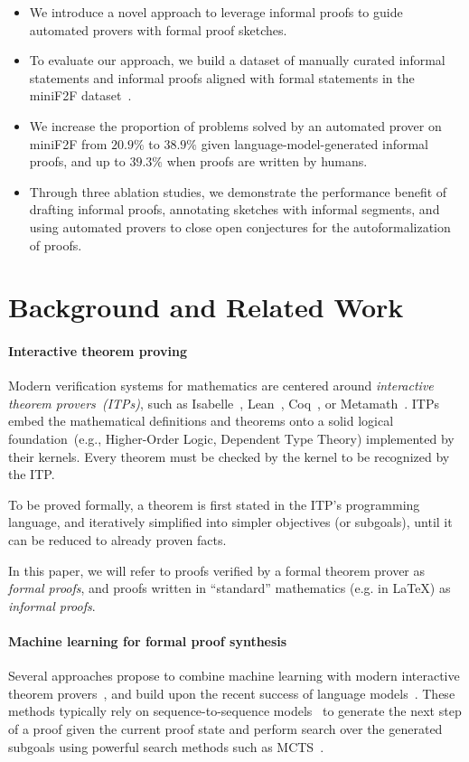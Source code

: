 \begin{itemize}
\item We introduce a novel approach to leverage informal proofs to guide automated provers with formal proof sketches.
\item To evaluate our approach, we build a dataset of manually curated informal statements and informal proofs aligned with formal statements in the miniF2F dataset~\citep{zheng2021minif2f}.

\item We increase the proportion of problems solved by an automated prover on miniF2F from $20.9\%$ to $38.9\%$ given language-model-generated informal proofs, and up to $39.3\%$
when proofs are written by humans.
\item Through three ablation studies, we demonstrate the performance benefit of drafting informal proofs, annotating sketches with informal segments, and using automated provers to close open conjectures for the autoformalization of proofs.
\end{itemize}

\section{Background and Related Work}
\label{sec:background}

\paragraph{Interactive theorem proving} Modern verification systems for mathematics are centered around \textit{interactive theorem provers~(ITPs)}, such as Isabelle~\citep{paulson1994isabelle}, Lean~\citep{moura2015lean}, Coq~\citep{barras1997coq}, or Metamath~\citep{metamath}. ITPs embed the mathematical definitions and theorems onto a solid logical foundation~(e.g., Higher-Order Logic, Dependent Type Theory) implemented by their kernels. Every theorem must be checked by the kernel to be recognized by the ITP.

To be proved formally, a theorem is first stated in the ITP's programming language, and iteratively simplified into simpler objectives (or subgoals), until it can be reduced to already proven facts.

In this paper, we will refer to proofs verified by a formal theorem prover as \textit{formal proofs}, and proofs written in ``standard'' mathematics (e.g. in \LaTeX) as \textit{informal proofs}.

\paragraph{Machine learning for formal proof synthesis} Several approaches propose to combine machine learning with modern interactive theorem provers~\citep{yang2019coqgym,gauthier2021tactictoe}, and build upon the recent success of language models~\citep{polu2020generative,pact,polu2022formal,jiang2022thor,lample2022hypertree}. These methods typically rely on sequence-to-sequence models~\citep{sutskever2014sequence} to generate the next step of a proof given the current proof state and perform search over the generated subgoals using powerful search methods such as MCTS~\citep{silver2018general}.

